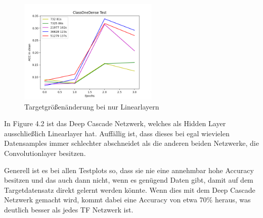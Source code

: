 \begin{figure}[htpb]
    \includegraphics[height=5cm]{../../Plots/ba_plots/targetgroesse/cod_ts.png}
    \caption{\label{fig:targetgroesselinear} Targetgrößenänderung bei nur Linearlayern}
\end{figure}

In Figure 4.2 ist das Deep Cascade Netzwerk, welches als Hidden Layer ausschließlich Linearlayer hat. Auffällig ist, dass dieses bei egal 
wievielen Datensamples immer schlechter abschneidet als die anderen beiden Netzwerke, die Convolutionlayer besitzen. 

Generell ist es bei allen Testplots so, dass sie nie eine annehmbar hohe Accuracy besitzen und das auch dann nicht, wenn es genügend Daten 
gibt, damit auf dem Targetdatensatz direkt gelernt werden könnte. Wenn dies mit dem Deep Cascade Netzwerk gemacht wird, kommt dabei eine 
Accuracy von etwa 70\% heraus, was deutlich besser als jedes TF Netzwerk ist. 
